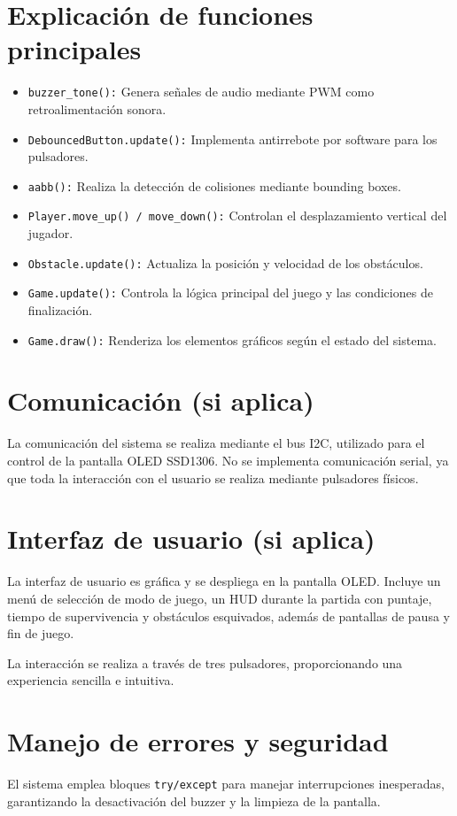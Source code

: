 \documentclass[12pt]{article}
\begin{document}
\section{Explicación de funciones principales}
\begin{itemize}
    \item \texttt{buzzer\_tone():} Genera señales de audio mediante PWM como retroalimentación sonora.
    \item \texttt{DebouncedButton.update():} Implementa antirrebote por software para los pulsadores.
    \item \texttt{aabb():} Realiza la detección de colisiones mediante bounding boxes.
    \item \texttt{Player.move\_up() / move\_down():} Controlan el desplazamiento vertical del jugador.
    \item \texttt{Obstacle.update():} Actualiza la posición y velocidad de los obstáculos.
    \item \texttt{Game.update():} Controla la lógica principal del juego y las condiciones de finalización.
    \item \texttt{Game.draw():} Renderiza los elementos gráficos según el estado del sistema.
\end{itemize}



\section{Comunicación (si aplica)}
La comunicación del sistema se realiza mediante el bus I2C, utilizado para el control de la pantalla OLED SSD1306. No se implementa comunicación serial, ya que toda la interacción con el usuario se realiza mediante pulsadores físicos.



\section{Interfaz de usuario (si aplica)}
La interfaz de usuario es gráfica y se despliega en la pantalla OLED. Incluye un menú de selección de modo de juego, un HUD durante la partida con puntaje, tiempo de supervivencia y obstáculos esquivados, además de pantallas de pausa y fin de juego.

La interacción se realiza a través de tres pulsadores, proporcionando una experiencia sencilla e intuitiva.



\section{Manejo de errores y seguridad}
El sistema emplea bloques \texttt{try/except} para manejar interrupciones inesperadas, garantizando la desactivación del buzzer y la limpieza de la pantalla.
\end{document}
